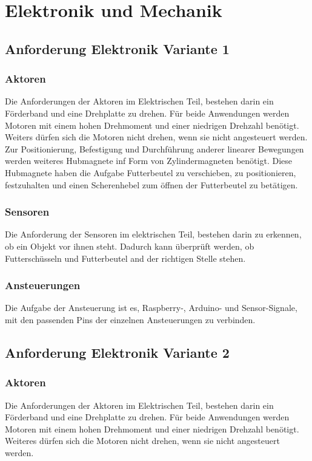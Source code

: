 \chapter{Elektronik und Mechanik}
\label{sec:elektronik-und-mechanik}

\section{Anforderung Elektronik Variante 1}
\subsection{Aktoren}
Die Anforderungen der Aktoren im Elektrischen Teil, bestehen darin ein Förderband und eine Drehplatte zu drehen. Für beide Anwendungen werden Motoren mit einem hohen Drehmoment und einer niedrigen Drehzahl benötigt. Weiters dürfen sich die Motoren nicht drehen, wenn sie nicht angesteuert werden.
Zur Positionierung, Befestigung und Durchführung anderer linearer Bewegungen werden weiteres Hubmagnete inf Form von Zylindermagneten benötigt. Diese Hubmagnete haben die Aufgabe Futterbeutel zu verschieben, zu positionieren, festzuhalten und einen Scherenhebel zum öffnen der Futterbeutel zu betätigen.  
\subsection{Sensoren}
Die Anforderung der Sensoren im elektrischen Teil, bestehen darin zu erkennen, ob ein Objekt vor ihnen steht. Dadurch kann überprüft werden, ob Futterschüsseln und Futterbeutel and der richtigen Stelle stehen.
\subsection{Ansteuerungen}
Die Aufgabe der Ansteuerung ist es, Raspberry-, Arduino- und Sensor-Signale, mit den passenden Pins der einzelnen Ansteuerungen zu verbinden. 

\section{Anforderung Elektronik Variante 2}
\subsection{Aktoren}
Die Anforderungen der Aktoren im Elektrischen Teil, bestehen darin ein Förderband und eine Drehplatte zu drehen. Für beide Anwendungen werden Motoren mit einem hohen Drehmoment und einer niedrigen Drehzahl benötigt. Weiteres dürfen sich die Motoren nicht drehen, wenn sie nicht angesteuert werden.
